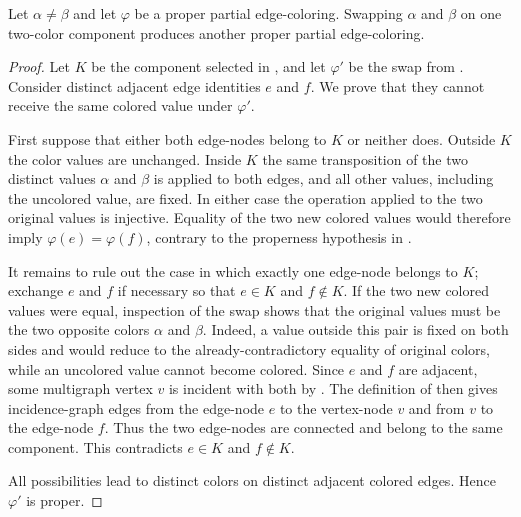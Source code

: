 \begin{lemma}
Let $\alpha\ne\beta$ and let $\varphi$ be a proper partial edge-coloring.
Swapping $\alpha$ and $\beta$ on one two-color component produces another
proper partial edge-coloring.
\end{lemma}
\begin{proof}
Let $K$ be the component selected in , and let
$\varphi'$ be the swap from .  Consider
distinct adjacent edge identities $e$ and $f$.  We prove that they cannot
receive the same colored value under $\varphi'$.

First suppose that either both edge-nodes belong to $K$ or neither does.
Outside $K$ the color values are unchanged.  Inside $K$ the same
transposition of the two distinct values $\alpha$ and $\beta$ is applied to
both edges, and all other values, including the uncolored value, are fixed.
In either case the operation applied to the two original values is
injective.  Equality of the two new colored values would therefore imply
$\varphi(e)=\varphi(f)$, contrary to the properness hypothesis in
.

It remains to rule out the case in which exactly one edge-node belongs to
$K$; exchange $e$ and $f$ if necessary so that $e\in K$ and $f\notin K$.
If the two new colored values were equal, inspection of the swap shows that
the original values must be the two opposite colors $\alpha$ and $\beta$.
Indeed, a value outside this pair is fixed on both sides and would reduce to
the already-contradictory equality of original colors, while an uncolored
value cannot become colored.  Since $e$ and $f$ are adjacent, some
multigraph vertex $v$ is incident with both by .
The definition of  then gives incidence-graph
edges from the edge-node $e$ to the vertex-node $v$ and from $v$ to the
edge-node $f$.  Thus the two edge-nodes are connected and belong to the
same component.  This contradicts $e\in K$ and $f\notin K$.

All possibilities lead to distinct colors on distinct adjacent colored
edges.  Hence $\varphi'$ is proper.
\end{proof}
